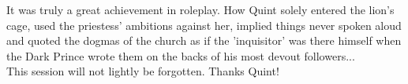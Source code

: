 It was truly a great achievement in roleplay. How Quint solely entered the lion's cage, used the priestess' ambitions against her, implied things never spoken aloud and quoted the dogmas of the church as if the 'inquisitor' was there himself when the Dark Prince wrote them on the backs of his most devout followers...\\

This session will not lightly be forgotten. Thanks Quint!\\

